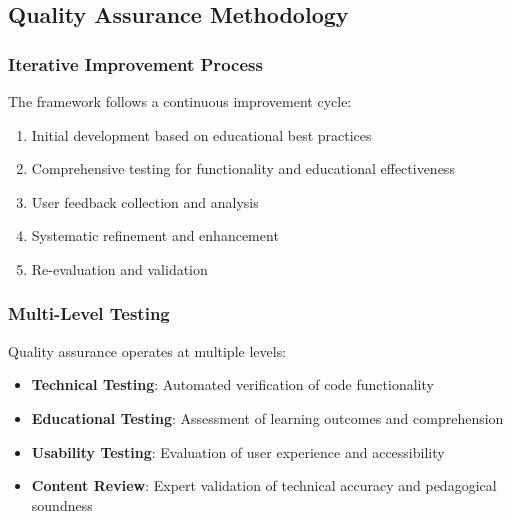 \subsection{Quality Assurance Methodology}

\subsubsection{Iterative Improvement Process}

The framework follows a continuous improvement cycle:
\begin{enumerate}
    \item Initial development based on educational best practices
    \item Comprehensive testing for functionality and educational effectiveness
    \item User feedback collection and analysis
    \item Systematic refinement and enhancement
    \item Re-evaluation and validation
\end{enumerate}

\subsubsection{Multi-Level Testing}

Quality assurance operates at multiple levels:
\begin{itemize}
    \item \textbf{Technical Testing}: Automated verification of code functionality
    \item \textbf{Educational Testing}: Assessment of learning outcomes and comprehension
    \item \textbf{Usability Testing}: Evaluation of user experience and accessibility
    \item \textbf{Content Review}: Expert validation of technical accuracy and pedagogical soundness
\end{itemize}
